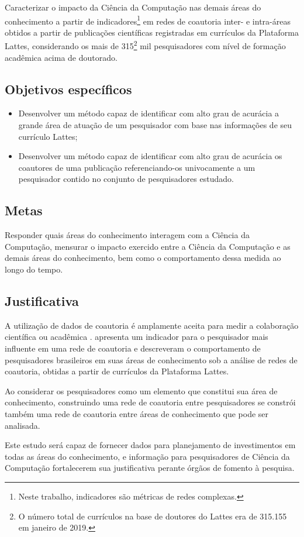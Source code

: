 Caracterizar o impacto da Ciência da Computação nas demais áreas do conhecimento a partir de indicadores\footnote{Neste trabalho, indicadores são métricas de redes complexas.} em redes de coautoria inter- e intra-áreas obtidos a partir de publicações científicas registradas em currículos da Plataforma Lattes, considerando os mais de 315\footnote{O número total de currículos na base de doutores do Lattes era de 315.155 em janeiro de 2019.} mil pesquisadores com nível de formação acadêmica acima de doutorado.

\subsection{Objetivos específicos}

\begin{itemize}
\item Desenvolver um método capaz de identificar com alto grau de acurácia a grande área de atuação de um pesquisador com base nas informações de seu currículo Lattes;
\item Desenvolver um método capaz de identificar com alto grau de acurácia os coautores de uma publicação referenciando-os univocamente a um pesquisador contido no conjunto de pesquisadores estudado.
\end{itemize}

\subsection{Metas}

Responder quais áreas do conhecimento interagem com a Ciência da Computação, mensurar o impacto exercido entre a Ciência da Computação e as demais áreas do conhecimento, bem como o comportamento dessa medida ao longo do tempo.

\subsection{Justificativa}

A utilização de dados de coautoria é amplamente aceita para medir a colaboração científica ou acadêmica \cite{katz1997research}.  apresenta um indicador para o pesquisador mais influente em uma rede de coautoria e  descreveram o comportamento de pesquisadores brasileiros em suas áreas de conhecimento sob a análise de redes de coautoria, obtidas a partir de currículos da Plataforma Lattes.

Ao considerar os pesquisadores como um elemento que constitui sua área de conhecimento, construindo uma rede de coautoria entre pesquisadores se constrói também uma rede de coautoria entre áreas de conhecimento que pode ser analisada.

Este estudo será capaz de fornecer dados para planejamento de investimentos em todas as áreas do conhecimento, e informação para pesquisadores de Ciência da Computação fortalecerem sua justificativa perante órgãos de fomento à pesquisa.
